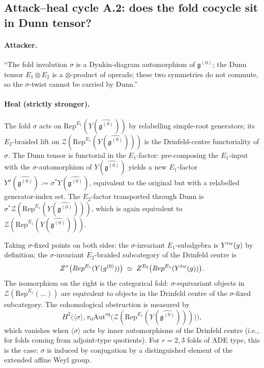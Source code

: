 \documentclass[11pt]{article}
\newcommand{\Eone}{E_{1}}
\newcommand{\Etwo}{E_{2}}
\newcommand{\cZ}{\mathcal{Z}}
\newcommand{\Rep}{\mathrm{Rep}}
\newcommand{\Auteq}{\mathrm{Aut}^{\mathrm{eq}}}
\newcommand{\frakg}{\mathfrak{g}}
\begin{document}
\subsection{Attack--heal cycle A.2: does the fold cocycle
  sit in Dunn tensor?}

\paragraph{Attacker.}
``The fold involution $\sigma$ is a Dynkin-diagram automorphism of
$\frakg^{(0)}$; the Dunn tensor $\Eone \otimes \Etwo$ is a
$\otimes$-product of operads; these two symmetries do not commute, so
the $\sigma$-twist cannot be carried by Dunn.''

\paragraph{Heal (strictly stronger).}
The fold $\sigma$ acts on $\Rep^{\Eone}(Y(\widehat{\frakg^{(0)}}))$ by
relabelling simple-root generators; its $\Etwo$-braided lift on
$\cZ(\Rep^{\Eone}(Y(\widehat{\frakg^{(0)}})))$ is the
Drinfeld-centre functoriality of $\sigma$. The Dunn tensor is functorial
in the $\Eone$-factor: pre-composing the $\Eone$-input with the
$\sigma$-automorphism of $Y(\widehat{\frakg^{(0)}})$ yields a new
$\Eone$-factor
$Y^{\sigma}(\widehat{\frakg^{(0)}}) := \sigma^* Y(\widehat{\frakg^{(0)}})$,
equivalent to the original but with a relabelled generator-index
set. The $\Etwo$-factor transported through Dunn is $\sigma^*
\cZ(\Rep^{\Eone}(Y(\widehat{\frakg^{(0)}})))$, which is again
equivalent to $\cZ(\Rep^{\Eone}(Y(\widehat{\frakg^{(0)}})))$.

Taking $\sigma$-fixed points on both sides: the $\sigma$-invariant
$\Eone$-subalgebra is $Y^{\mathrm{tw}}(\widehat\frakg)$ by definition;
the $\sigma$-invariant $\Etwo$-braided subcategory of the Drinfeld
centre is
\[
  \cZ^{\sigma}\bigl(\Rep^{\Eone}(Y(\widehat{\frakg^{(0)}}))\bigr)
  \;\simeq\;
  \cZ^{\Etwo}\bigl(\Rep^{\Eone}(Y^{\mathrm{tw}}(\widehat\frakg))\bigr).
\]
The isomorphism on the right is the categorical fold: $\sigma$-equivariant
objects in $\cZ(\Rep^{\Eone}(\ldots))$ are equivalent to objects in the
Drinfeld centre of the $\sigma$-fixed subcategory. The cohomological
obstruction is measured by
\[
  H^2(\langle\sigma\rangle,
  \pi_0 \Auteq\bigl(\cZ(\Rep^{\Eone}(Y(\widehat{\frakg^{(0)}})))\bigr)\bigr),
\]
which vanishes when $\langle\sigma\rangle$ acts by inner
automorphisms of the Drinfeld centre (i.e., for folds coming from
adjoint-type quotients). For $r = 2, 3$ folds of ADE type, this is the
case: $\sigma$ is induced by conjugation by a distinguished element of
the extended affine Weyl group.
\end{document}
